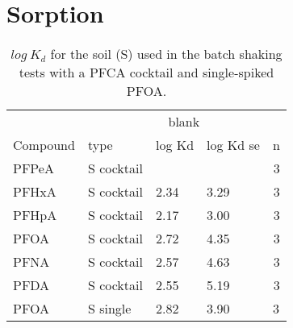 \chapter{Sorption}\label{appSec:Sorption} 

\begin{table}[ht]
\caption{$log~K_d$ for the soil (S) used in the batch shaking tests with a PFCA cocktail and single-spiked PFOA.}
\centering
\label{apptab:soil_Kd}
\begin{tabular}{llllr} \toprule
         & \multicolumn{4}{c}{blank}                                \\ \cline{2-5} 
Compound & type        & log Kd & log Kd se & \multicolumn{1}{l}{n} \\ \midrule
PFPeA    & S cocktail &        &           & 3                     \\
PFHxA    & S cocktail & 2.34   & 3.29      & 3                     \\
PFHpA    & S cocktail & 2.17   & 3.00      & 3                     \\
PFOA     & S cocktail & 2.72   & 4.35      & 3                     \\
PFNA     & S cocktail & 2.57   & 4.63      & 3                     \\
PFDA     & S cocktail & 2.55   & 5.19      & 3                     \\
PFOA     & S single    & 2.82   & 3.90      & \multicolumn{1}{l}{3} \\ \bottomrule
\end{tabular}
\end{table}


